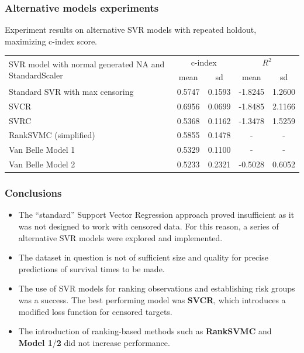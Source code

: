 \documentclass{beamer}
\begin{document}
\begin{frame}
\frametitle{Alternative models experiments}
Experiment results on alternative SVR models with repeated holdout, maximizing c-index score.
\begin{footnotesize}
\begin{center}
 \begin{tabular}{ |m{5cm}|c|c|c|c| }
\hline
\multirow{2}{=}{SVR model with normal generated NA and StandardScaler} & \multicolumn{2}{|c|}{c-index} & \multicolumn{2}{|c|}{$R^2$} \\ \cline{2-5}
& mean & sd & mean & sd \\ \hline
Standard SVR with max censoring & 0.5747 & 0.1593 & -1.8245 & 1.2600 \\ \hline
SVCR & 0.6956 & 0.0699 & -1.8485 & 2.1166 \\ \hline
SVRC & 0.5368 & 0.1162 & -1.3478 & 1.5259 \\ \hline
RankSVMC (simplified) & 0.5855 & 0.1478 & - & - \\ \hline
Van Belle Model 1 & 0.5329 & 0.1100 & - & - \\ \hline
Van Belle Model 2 & 0.5233 & 0.2321 & -0.5028 & 0.6052 \\ \hline
\end{tabular}
\end{center} 
\end{footnotesize}
\end{frame}

\begin{frame}
\frametitle{Conclusions}
\vspace{-1cm}
\begin{itemize}
\item The ``standard'' Support Vector Regression approach proved insufficient as it was not designed to work with censored data. For this reason, a series of alternative SVR models were explored and implemented.
\item The dataset in question is not of sufficient size and quality for precise predictions of survival times to be made.
\item The use of SVR models for ranking observations and establishing risk groups was a success. The best performing model was \textbf{SVCR}, which introduces a modified loss function for censored targets.
\item The introduction of ranking-based methods such as \textbf{RankSVMC} and \textbf{Model 1}/\textbf{2} did not increase performance.
\end{itemize}
\end{frame}
\end{document}
